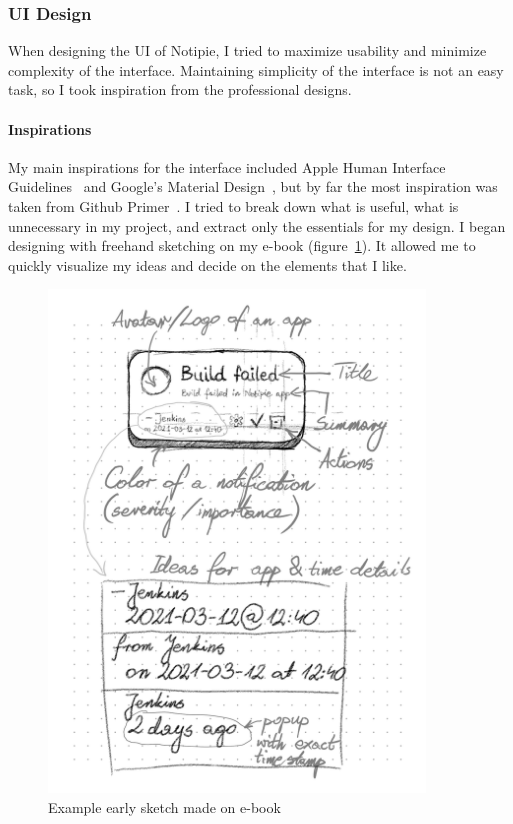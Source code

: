 \subsubsection{UI Design}\label{sec:ui-design}

When designing the \ac{UI} of Notipie,
I tried to maximize usability
and minimize complexity of the interface.
Maintaining simplicity of the interface is not an easy task,
so I took inspiration from the professional designs.

\paragraph*{Inspirations}\label{sec:inspirations}

My main inspirations for the interface included
Apple Human Interface Guidelines~\cite{apple_inc_human_2022}
and Google's Material Design~\cite{google_llc_material_2022},
but by far the most inspiration was taken from
Github Primer~\cite{github_inc_primer_2022}.
I tried to break down what is useful,
what is unnecessary in my project,
and extract only the essentials for my design.
I began designing with freehand sketching
on my e-book (figure~\ref{fig:early-ui-sketches}).
It allowed me to quickly visualize my ideas
and decide on the elements that I like.

\begin{figure}[h]
      \centering
      \includegraphics[width=10cm,keepaspectratio]{img/early_ui_sketches.png}
      \caption{Example early sketch made on e-book}
      \label{fig:early-ui-sketches}
\end{figure}

